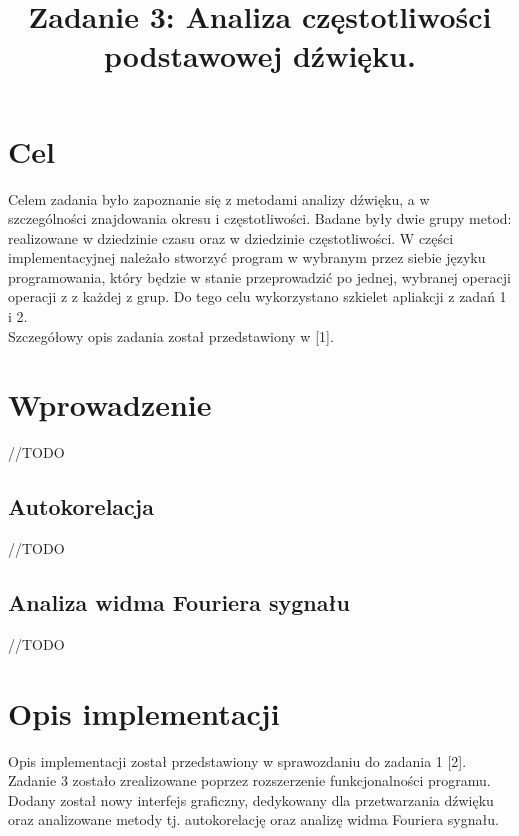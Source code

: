 \documentclass{classrep}
\author{
  \studentinfo{Jakub Antosik}{206788} \and
  \studentinfo{Andrzej Lisowski}{206807} 
}
\title{Zadanie 3: Analiza częstotliwości podstawowej dźwięku.}
\begin{document}
\maketitle

\section{Cel}
Celem zadania było zapoznanie się z metodami analizy dźwięku, a w szczególności znajdowania okresu i częstotliwości. Badane były dwie grupy metod: realizowane w dziedzinie czasu oraz w dziedzinie częstotliwości. W części implementacyjnej należało stworzyć program w wybranym przez siebie języku programowania, który będzie w stanie przeprowadzić po jednej, wybranej operacji operacji z z każdej z grup. Do tego celu wykorzystano szkielet apliakcji z zadań 1 i 2.\\
\indent
Szczegółowy opis zadania został przedstawiony w [1].

\section{Wprowadzenie}
//TODO

\subsection{Autokorelacja}
//TODO

\subsection{Analiza widma Fouriera sygnału}
//TODO

\section{Opis implementacji}
Opis implementacji został przedstawiony w sprawozdaniu do zadania 1 [2]. Zadanie 3 zostało zrealizowane poprzez rozszerzenie funkcjonalności programu. Dodany został nowy interfejs graficzny, dedykowany dla przetwarzania dźwięku oraz analizowane metody tj. autokorelację oraz analizę widma Fouriera sygnału.
\end{document}

